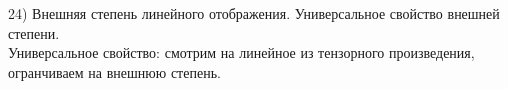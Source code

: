 24) Внешняя степень линейного отображения. Универсальное свойство внешней степени.\\
Универсальное свойство: смотрим на линейное из тензорного произведения, огранчиваем на внешнюю степень.\\
